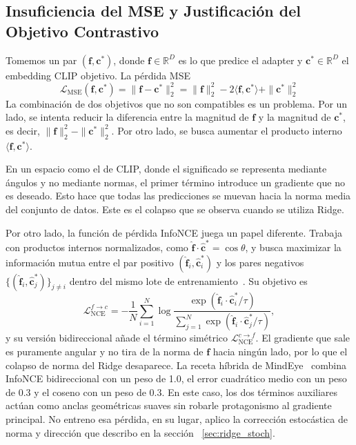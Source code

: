 \subsection{Insuficiencia del MSE y Justificación del Objetivo Contrastivo}

Tomemos un par $(\mathbf{f},\mathbf{c}^{*})$, donde $\mathbf{f}\in\mathbb{R}^{D}$ es lo que 
predice el adapter y $\mathbf{c}^{*}\in\mathbb{R}^{D}$ el embedding CLIP objetivo. La pérdida 
MSE
\begin{equation}
\mathcal{L}_{\text{MSE}}(\mathbf{f},\mathbf{c}^{*}) = \|\mathbf{f}-\mathbf{c}^{*}\|_2^2 = \|\mathbf{f}\|_2^2 - 2\langle\mathbf{f},\mathbf{c}^{*}\rangle + \|\mathbf{c}^{*}\|_2^2
\end{equation}
La combinación de dos objetivos que no son compatibles es un problema. Por un lado, se intenta reducir la 
diferencia entre la magnitud de $\mathbf{f}$ y la magnitud de $\mathbf{c}^{*}$, es decir, 
$\|\mathbf{f}\|_2^2 - \|\mathbf{c}^{*}\|_2^2$. Por otro lado, se busca aumentar el producto interno 
$\langle\mathbf{f},\mathbf{c}^{*}\rangle$.

En un espacio como el de CLIP, donde el significado se representa mediante ángulos y no mediante normas, 
el primer término introduce un gradiente que no es deseado. Esto hace que todas las predicciones se muevan 
hacia la norma media del conjunto de datos. Este es el colapso que se observa cuando se utiliza Ridge.

Por otro lado, la función de pérdida InfoNCE juega un papel diferente. Trabaja con productos internos 
normalizados, como $\hat{\mathbf{f}}\cdot\hat{\mathbf{c}}^{*} = \cos\theta$, y busca maximizar la 
información mutua entre el par positivo $(\hat{\mathbf{f}}_i,\hat{\mathbf{c}}^{*}_i)$ y los pares 
negativos $\{(\hat{\mathbf{f}}_i,\hat{\mathbf{c}}^{*}_j)\}_{j\neq i}$ dentro del mismo lote de 
entrenamiento~\cite{vandenoord2018representation}. Su objetivo es
\begin{equation}
\mathcal{L}_{\text{NCE}}^{f\rightarrow c} = -\frac{1}{N}\sum_{i=1}^{N}\log\frac{\exp(\hat{\mathbf{f}}_i\cdot\hat{\mathbf{c}}^{*}_i/\tau)}{\sum_{j=1}^{N}\exp(\hat{\mathbf{f}}_i\cdot\hat{\mathbf{c}}^{*}_j/\tau)},
\end{equation}
y su versión bidireccional añade el término simétrico 
$\mathcal{L}_{\text{NCE}}^{c\rightarrow f}$. 
El gradiente que sale es puramente angular y no tira de la norma de $\mathbf{f}$ hacia ningún lado, por lo que el colapso de norma del Ridge 
desaparece. La receta híbrida de MindEye~\cite{scotti2023mindeye} combina InfoNCE bidireccional con un 
peso de 1.0, el error cuadrático medio con un peso de 0.3 y el coseno con un peso de 0.3.
En este caso, los dos términos auxiliares actúan como anclas geométricas suaves sin robarle protagonismo 
al gradiente principal. No entreno esa pérdida, en su lugar, aplico la corrección estocástica de norma y 
dirección que describo en la sección ~\ref{sec:ridge_stoch}.

